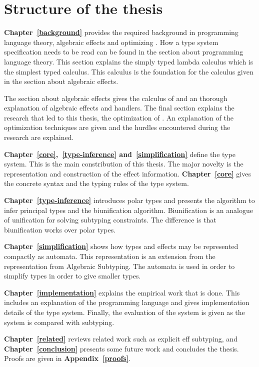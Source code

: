 \section{Structure of the thesis}
\textbf{Chapter~\ref{background}} provides the required background in programming language theory, algebraic effects and optimizing \eff. How a type system specification needs to be read can be found in the section about programming language theory. This section explains the simply typed lambda calculus which is the simplest typed calculus. This calculus is the foundation for the calculus given in the section about algebraic effects. 

The section about algebraic effects gives the calculus of \eff and an thorough explanation of algebraic effects and handlers. The final section explains the research that led to this thesis, the optimization of \eff. An explanation of the optimization techniques are given and the hurdles encountered during the research are explained. 

\textbf{Chapter~\ref{core},~\ref{type-inference} and~\ref{simplification}} define the \core type system. This is the main constribution of this thesis. The major novelty is the representation and construction of the effect information. \textbf{Chapter~\ref{core}} gives the concrete syntax and the typing rules of the \core type system. 

\textbf{Chapter~\ref{type-inference}} introduces polar types and presents the algorithm to infer principal types and the biunification algorithm. Biunification is an analogue of unification for solving subtyping constraints. The difference is that biunification works over polar types. 

\textbf{Chapter~\ref{simplification}} shows how types and effects may be represented compactly as automata. This representation is an extension from the representation from Algebraic Subtyping. The automata is used in order to simplify types in order to give smaller types.

\textbf{Chapter~\ref{implementation}} explains the empirical work that is done. This includes an explanation of the \eff programming language and gives implementation details of the \core type system. Finally, the evaluation of the \core system is given as the system is compared with subtyping.

\textbf{Chapter~\ref{related}} reviews related work such as explicit eff subtyping, and \textbf{Chapter~\ref{conclusion}} presents some future work and concludes the thesis. Proofs are given in \textbf{Appendix~\ref{proofs}}.